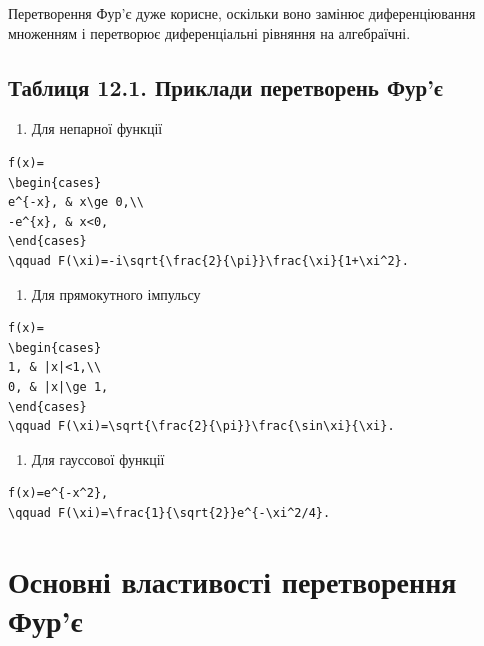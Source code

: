 \documentclass[
  ukrainian,
]{article}
\providecommand{\tightlist}{%
  \setlength{\itemsep}{0pt}\setlength{\parskip}{0pt}}
\begin{document}
Перетворення Фур'є дуже корисне, оскільки воно замінює диференціювання
множенням і перетворює диференціальні рівняння на алгебраїчні.

\subsection{Таблиця 12.1. Приклади перетворень
Фур'є}\label{ux442ux430ux431ux43bux438ux446ux44f-12.1.-ux43fux440ux438ux43aux43bux430ux434ux438-ux43fux435ux440ux435ux442ux432ux43eux440ux435ux43dux44c-ux444ux443ux440ux454}

\begin{enumerate}
\def\labelenumi{\arabic{enumi}.}
\tightlist
\item
  Для непарної функції
\end{enumerate}

\begin{verbatim}
f(x)=
\begin{cases}
e^{-x}, & x\ge 0,\\
-e^{x}, & x<0,
\end{cases}
\qquad F(\xi)=-i\sqrt{\frac{2}{\pi}}\frac{\xi}{1+\xi^2}.
\end{verbatim}

\begin{enumerate}
\def\labelenumi{\arabic{enumi}.}
\setcounter{enumi}{1}
\tightlist
\item
  Для прямокутного імпульсу
\end{enumerate}

\begin{verbatim}
f(x)=
\begin{cases}
1, & |x|<1,\\
0, & |x|\ge 1,
\end{cases}
\qquad F(\xi)=\sqrt{\frac{2}{\pi}}\frac{\sin\xi}{\xi}.
\end{verbatim}

\begin{enumerate}
\def\labelenumi{\arabic{enumi}.}
\setcounter{enumi}{2}
\tightlist
\item
  Для гауссової функції
\end{enumerate}

\begin{verbatim}
f(x)=e^{-x^2},
\qquad F(\xi)=\frac{1}{\sqrt{2}}e^{-\xi^2/4}.
\end{verbatim}

\section{Основні властивості перетворення
Фур'є}\label{ux43eux441ux43dux43eux432ux43dux456-ux432ux43bux430ux441ux442ux438ux432ux43eux441ux442ux456-ux43fux435ux440ux435ux442ux432ux43eux440ux435ux43dux43dux44f-ux444ux443ux440ux454}
\end{document}
